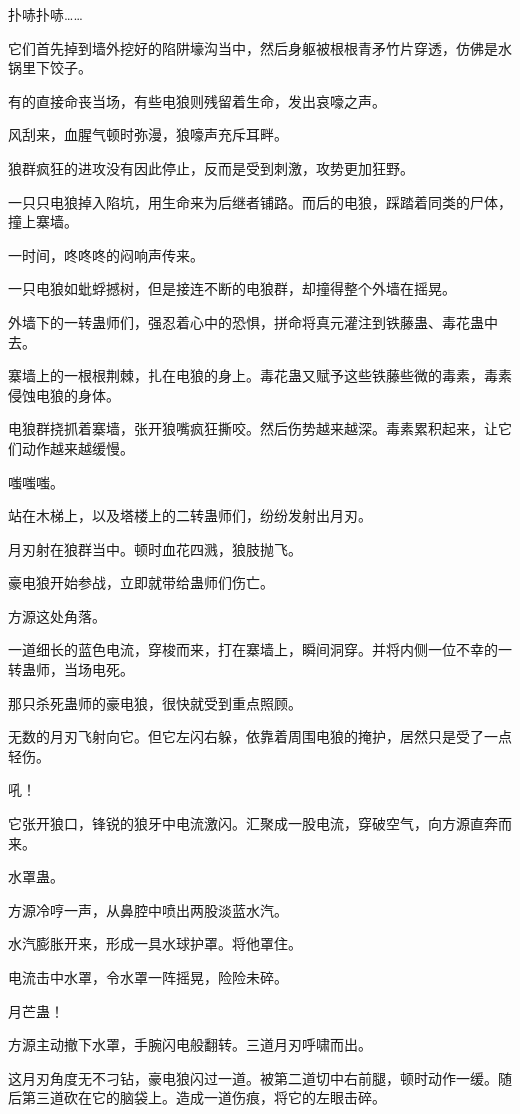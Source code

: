 \begin{this_body}
扑哧扑哧……

它们首先掉到墙外挖好的陷阱壕沟当中，然后身躯被根根青矛竹片穿透，仿佛是水锅里下饺子。

有的直接命丧当场，有些电狼则残留着生命，发出哀嚎之声。

风刮来，血腥气顿时弥漫，狼嚎声充斥耳畔。

狼群疯狂的进攻没有因此停止，反而是受到刺激，攻势更加狂野。

一只只电狼掉入陷坑，用生命来为后继者铺路。而后的电狼，踩踏着同类的尸体，撞上寨墙。

一时间，咚咚咚的闷响声传来。

一只电狼如蚍蜉撼树，但是接连不断的电狼群，却撞得整个外墙在摇晃。

外墙下的一转蛊师们，强忍着心中的恐惧，拼命将真元灌注到铁藤蛊、毒花蛊中去。

寨墙上的一根根荆棘，扎在电狼的身上。毒花蛊又赋予这些铁藤些微的毒素，毒素侵蚀电狼的身体。

电狼群挠抓着寨墙，张开狼嘴疯狂撕咬。然后伤势越来越深。毒素累积起来，让它们动作越来越缓慢。

嗤嗤嗤。

站在木梯上，以及塔楼上的二转蛊师们，纷纷发射出月刃。

月刃射在狼群当中。顿时血花四溅，狼肢抛飞。

豪电狼开始参战，立即就带给蛊师们伤亡。

方源这处角落。

一道细长的蓝色电流，穿梭而来，打在寨墙上，瞬间洞穿。并将内侧一位不幸的一转蛊师，当场电死。

那只杀死蛊师的豪电狼，很快就受到重点照顾。

无数的月刃飞射向它。但它左闪右躲，依靠着周围电狼的掩护，居然只是受了一点轻伤。

吼！

它张开狼口，锋锐的狼牙中电流激闪。汇聚成一股电流，穿破空气，向方源直奔而来。

水罩蛊。

方源冷哼一声，从鼻腔中喷出两股淡蓝水汽。

水汽膨胀开来，形成一具水球护罩。将他罩住。

电流击中水罩，令水罩一阵摇晃，险险未碎。

月芒蛊！

方源主动撤下水罩，手腕闪电般翻转。三道月刃呼啸而出。

这月刃角度无不刁钻，豪电狼闪过一道。被第二道切中右前腿，顿时动作一缓。随后第三道砍在它的脑袋上。造成一道伤痕，将它的左眼击碎。


\end{this_body}
